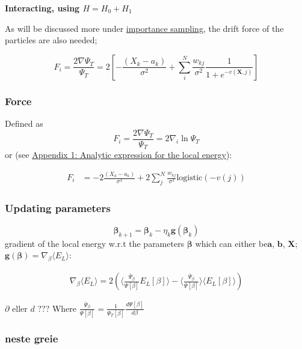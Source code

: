 \documentclass[%
oneside,                 %
final,                   %
10pt]{article}
\begin{document}
\textbf{Interacting, using $H=H_0+H_1$}

As will be discussed more under \hyperref[importance_sampling]{importance sampling}, the drift force of the  particles are also needed;

\begin{equation}
F_i = \frac{2\nabla \Psi_T}{\Psi_T} = 2 \left[- \frac{(X_k - a_k)}{\sigma^2} + \sum_{i}^N \frac{w_{kj}}{\sigma^2}\frac{1}{1 + e^{-v(\bm X,j)}} \right]
\end{equation} 



\subsubsection{Force}
Defined as
\begin{equation}
F_i = \frac{2\nabla \Psi_T}{\Psi_T}= 2 \nabla_i \ln \Psi_T
\end{equation}
or (see \hyperref[APP_2:le_1]{Appendix 1: Analytic expression for the local energy}):

\begin{equation}
\begin{aligned}
F_i
&= - 2\frac{(X_k - a_k)}{\sigma^2} + 2\sum_{j}^N \frac{w_{kj}}{\sigma^2} \text {logistic} ( -v(j) ) 
\end{aligned}
\label{eq:qforce}
\end{equation}

\subsubsection{Updating parameters}
\begin{equation}
\bm{\beta}_{k+1}=\bm{\beta}_{k}-\eta_k  \bm g (\bm{\beta}_k)
\label{eq:GD}
\end{equation}
gradient of the local energy w.r.t the parameters $\bm \beta$ which can either be$\bm a$, $\bm b$, $\bm X$; $\bm g (\bm \beta)=\nabla_{\beta} \langle E_L \rangle$:

\begin{align*}
\nabla_{\beta} \langle E_L \rangle = 2 \left( \langle \frac{\bar \Psi_{\beta}}{\Psi [\beta]} E_L[\beta] \rangle - \langle \frac{\bar \Psi_{\beta}}{\Psi [\beta]} \rangle \langle E_L[\beta] \rangle  \right)
\end{align*}

$\partial$ eller $d$ ???
Where $\frac{\bar \Psi_{\beta}}{\Psi [\beta]} = \frac{1}{\Psi_T [\beta]}\frac{d \Psi[\beta]}{d \beta} $


\subsubsection{neste greie}
\end{document}
